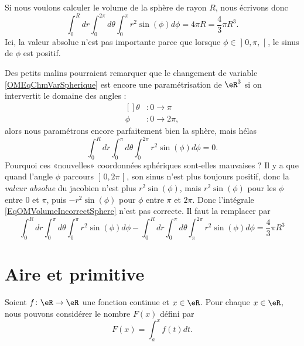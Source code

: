 Si nous voulons calculer le volume de la sphère de rayon $R$, nous écrivons donc
\begin{equation}
	\int_0^Rdr\int_{0}^{2\pi}d\theta\int_0^{\pi}r^2 \sin(\phi)d\phi=4\pi R=\frac{ 4 }{ 3 }\pi R^3.
\end{equation}
Ici, la valeur absolue n'est pas importante parce que lorsque $\phi\in\mathopen] 0,\pi ,  \mathclose[$, le sinus de $\phi$ est positif.

Des petits malins pourraient remarquer que le changement de variable \eqref{OMEqChmVarSpherique} est encore une paramétrisation de $\eR^3$ si on intervertit le domaine des angles :
\begin{equation}
	\begin{aligned}[]
		\theta&\colon 0 \to \pi\\
		\phi	&\colon 0\to 2\pi,
	\end{aligned}
\end{equation}
alors nous paramétrons encore parfaitement bien la sphère, mais hélas
\begin{equation}		\label{EqOMVolumeIncorrectSphere}
	\int_0^Rdr\int_{0}^{\pi}d\theta\int_0^{2\pi}r^2 \sin(\phi)d\phi=0.
\end{equation}
Pourquoi ces «nouvelles» coordonnées sphériques sont-elles mauvaises ? Il y a que quand l'angle $\phi$ parcours $\mathopen] 0 , 2\pi \mathclose[$, son sinus n'est plus toujours positif, donc la \emph{valeur absolue} du jacobien n'est plus $r^2\sin(\phi)$, mais $r^2\sin(\phi)$ pour les $\phi$ entre $0$ et $\pi$, puis $-r^2\sin(\phi)$ pour $\phi$ entre $\pi$ et $2\pi$. Donc l'intégrale \eqref{EqOMVolumeIncorrectSphere} n'est pas correcte. Il faut la remplacer par
\begin{equation}
	\int_0^Rdr\int_{0}^{\pi}d\theta\int_0^{\pi}r^2 \sin(\phi)d\phi- \int_0^Rdr\int_{0}^{\pi}d\theta\int_{\pi}^{2\pi}r^2 \sin(\phi)d\phi = \frac{ 4 }{ 3 }\pi R^3
\end{equation}

\section{Aire et primitive}

Soient $f\colon \eR\to \eR$ une fonction continue et $x\in\eR$. Pour chaque $x\in\eR$, nous pouvons considérer le nombre $F(x)$ défini par
\begin{equation}
	F(x)=\int_a^x f(t)dt.
\end{equation}

